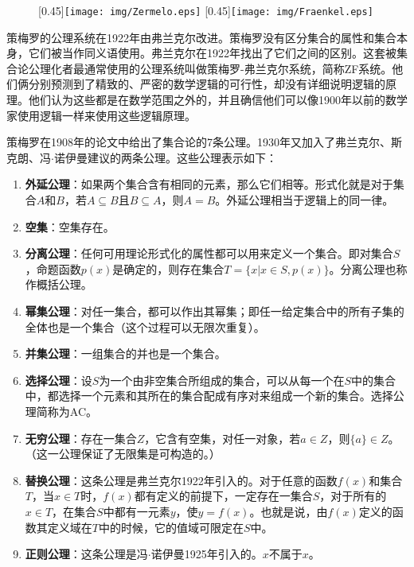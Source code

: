 \documentclass{article}
\begin{document}
\begin{figure}[htbp]
  \centering
  [0.45\linewidth]{\texttt{[image: img/Zermelo.eps]}} \quad
  [0.45\linewidth]{\texttt{[image: img/Fraenkel.eps]}}
  \captionsetup{labelformat=empty}
  \caption{}
  \label{fig:Zermelo-and-Fraenkel}
\end{figure}

 
策梅罗的公理系统在1922年由弗兰克尔改进。策梅罗没有区分集合的属性和集合本身，它们被当作同义语使用。弗兰克尔在1922年找出了它们之间的区别。这套被集合论公理化者最通常使用的公理系统叫做策梅罗-弗兰克尔系统，简称ZF系统。他们俩分别预测到了精致的、严密的数学逻辑的可行性，却没有详细说明逻辑的原理。他们认为这些都是在数学范围之外的，并且确信他们可以像1900年以前的数学家使用逻辑一样来使用这些逻辑原理。

策梅罗在1908年的论文中给出了集合论的7条公理。1930年又加入了弗兰克尔、斯克朗、冯$\cdot$诺伊曼建议的两条公理。这些公理表示如下：

\begin{enumerate}
\item \textbf{外延公理}：如果两个集合含有相同的元素，那么它们相等。形式化就是对于集合$A$和$B$，若$A \subseteq B$且$B \subseteq A$，则$A = B$。外延公理相当于逻辑上的同一律。
\item \textbf{空集}：空集存在。
\item \textbf{分离公理}：任何可用理论形式化的属性都可以用来定义一个集合。即对集合$S$，命题函数$p(x)$是确定的，则存在集合$T = \{ x | x \in S, p(x)\}$。分离公理也称作概括公理。
\item \textbf{幂集公理}：对任一集合，都可以作出其幂集；即任一给定集合中的所有子集的全体也是一个集合（这个过程可以无限次重复）。
\item \textbf{并集公理}：一组集合的并也是一个集合。
\item \textbf{选择公理}：设$S$为一个由非空集合所组成的集合，可以从每一个在$S$中的集合中，都选择一个元素和其所在的集合配成有序对来组成一个新的集合。选择公理简称为AC。
\item \textbf{无穷公理}：存在一集合$Z$，它含有空集，对任一对象，若$a \in Z$，则$\{a\} \in Z$。（这一公理保证了无限集是可构造的。）
\item \textbf{替换公理}：这条公理是弗兰克尔1922年引入的。对于任意的函数$f(x)$和集合$T$，当$x \in T$时，$f(x)$都有定义的前提下，一定存在一集合$S$，对于所有的$x \in T$，在集合$S$中都有一元素$y$，使$y = f(x)$。也就是说，由$f(x)$定义的函数其定义域在$T$中的时候，它的值域可限定在$S$中。
\item \textbf{正则公理}：这条公理是冯$\cdot$诺伊曼1925年引入的。$x$不属于$x$。
\end{enumerate}
\end{document}
